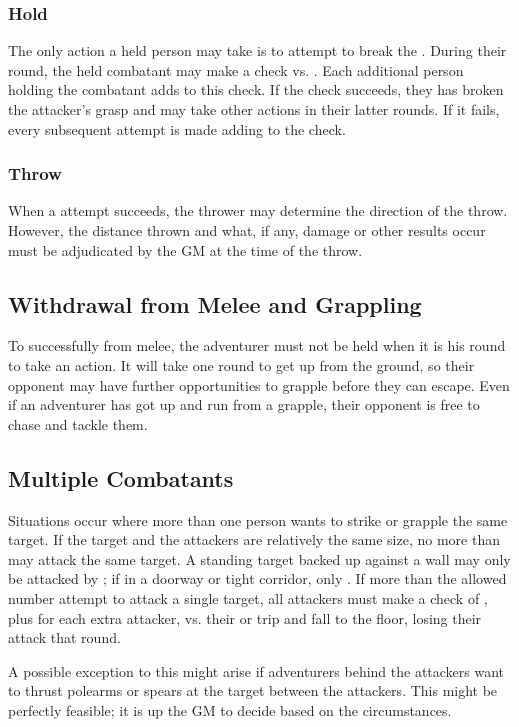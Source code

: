 \begin{multicols}{2}
\subsubsection{Hold}
The only action a held person may take is to attempt to break the . During their round, the held combatant may make a  check vs. \STR. Each additional person holding the combatant adds  to this \STR check. If the check succeeds, they has broken the attacker's grasp and may take other actions in their latter rounds. If it fails, every subsequent attempt is made adding  to the \STR check.
\subsubsection{Throw}
When a  attempt succeeds, the thrower may determine the direction of the throw. However, the distance thrown and what, if any, damage or other results occur must be adjudicated by the GM at the time of the throw.
\subsection{Withdrawal from Melee and Grappling}
To successfully  from melee, the adventurer must not be held when it is his round to take an action. It will take one round to get up from the ground, so their opponent may have further opportunities to grapple before they can escape. Even if an adventurer has got up and run from a grapple, their opponent is free to chase and tackle them.
\subsection{Multiple Combatants}
Situations occur where more than one person wants to strike or grapple the same target. If the target and the attackers are relatively the same size, no more than  may attack the same target. A standing target backed up against a wall may only be attacked by ; if in a doorway or tight corridor, only . If more than the allowed number attempt to attack a single target, all attackers must make a check of , plus  for each extra attacker, vs. their \AGI or trip and fall to the floor, losing their attack that round.

A possible exception to this might arise if adventurers behind the attackers want to thrust polearms or spears at the target between the attackers. This might be perfectly feasible; it is up the GM to decide based on the circumstances.

\end{multicols}
